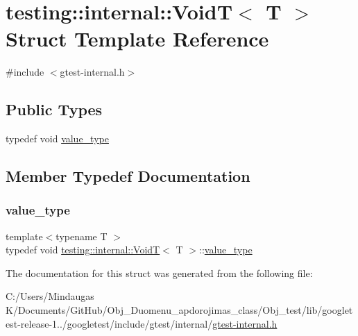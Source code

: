 \hypertarget{structtesting_1_1internal_1_1_void_t}{}\section{testing\+::internal\+::VoidT$<$ T $>$ Struct Template Reference}
\label{structtesting_1_1internal_1_1_void_t}


{\ttfamily \#include $<$gtest-\/internal.\+h$>$}

\subsection*{Public Types}
\begin{DoxyCompactItemize}
\item 
typedef void \mbox{\hyperlink{structtesting_1_1internal_1_1_void_t_a29e6a3f3989ddb47103944b350f1bec0}{value\+\_\+type}}
\end{DoxyCompactItemize}


\subsection{Member Typedef Documentation}
\mbox{\label{structtesting_1_1internal_1_1_void_t_a29e6a3f3989ddb47103944b350f1bec0}} 
\subsubsection{\texorpdfstring{value\_type}{value\_type}}
{\footnotesize\ttfamily template$<$typename T $>$ \\
typedef void \mbox{\hyperlink{structtesting_1_1internal_1_1_void_t}{testing\+::internal\+::\+VoidT}}$<$ T $>$\+::\mbox{\hyperlink{structtesting_1_1internal_1_1_void_t_a29e6a3f3989ddb47103944b350f1bec0}{value\+\_\+type}}}



The documentation for this struct was generated from the following file\+:\begin{DoxyCompactItemize}
\item 
C\+:/\+Users/\+Mindaugas K/\+Documents/\+Git\+Hub/\+Obj\+\_\+\+Duomenu\+\_\+apdorojimas\+\_\+class/\+Obj\+\_\+test/lib/googletest-\/release-\/1../googletest/include/gtest/internal/\mbox{\hyperlink{_obj__test_2lib_2googletest-release-1_88_81_2googletest_2include_2gtest_2internal_2gtest-internal_8h}{gtest-\/internal.\+h}}\end{DoxyCompactItemize}
